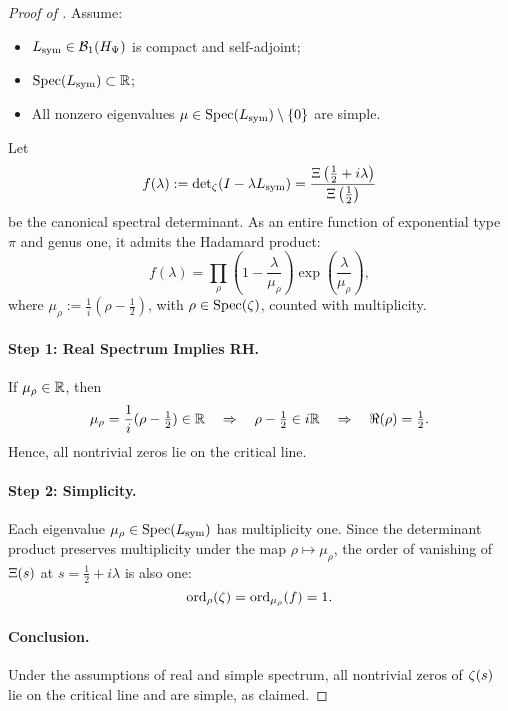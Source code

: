 \begin{proof}[Proof of ]
Assume:
\begin{itemize}
  \item \( L_{\mathrm{sym}} \in \mathcal{B}_1(H_{\Psi}) \) is compact and self-adjoint;
  \item \( \operatorname{Spec}(L_{\mathrm{sym}}) \subset \mathbb{R} \);
  \item All nonzero eigenvalues \( \mu \in \operatorname{Spec}(L_{\mathrm{sym}}) \setminus \{0\} \) are simple.
\end{itemize}

Let
\[
f(\lambda) := \det\nolimits_\zeta(I - \lambda L_{\mathrm{sym}}) = \frac{\Xi\left(\tfrac{1}{2} + i\lambda\right)}{\Xi\left(\tfrac{1}{2}\right)}
\]
be the canonical spectral determinant. As an entire function of exponential type \( \pi \) and genus one, it admits the Hadamard product:
\[
f(\lambda) = \prod_\rho \left(1 - \frac{\lambda}{\mu_\rho} \right) \exp\left( \frac{\lambda}{\mu_\rho} \right),
\]
where \( \mu_\rho := \frac{1}{i}(\rho - \tfrac{1}{2}) \), with \( \rho \in \operatorname{Spec}(\zeta) \), counted with multiplicity.

\paragraph{Step 1: Real Spectrum Implies RH.}
If \( \mu_\rho \in \mathbb{R} \), then
\[
\mu_\rho = \frac{1}{i}(\rho - \tfrac{1}{2}) \in \mathbb{R} \quad \Rightarrow \quad \rho - \tfrac{1}{2} \in i\mathbb{R} \quad \Rightarrow \quad \Re(\rho) = \tfrac{1}{2}.
\]
Hence, all nontrivial zeros lie on the critical line.

\paragraph{Step 2: Simplicity.}
Each eigenvalue \( \mu_\rho \in \operatorname{Spec}(L_{\mathrm{sym}}) \) has multiplicity one. Since the determinant product preserves multiplicity under the map \( \rho \mapsto \mu_\rho \), the order of vanishing of \( \Xi(s) \) at \( s = \tfrac{1}{2} + i\lambda \) is also one:
\[
\operatorname{ord}_\rho(\zeta) = \operatorname{ord}_{\mu_\rho}(f) = 1.
\]

\paragraph{Conclusion.}
Under the assumptions of real and simple spectrum, all nontrivial zeros of \( \zeta(s) \) lie on the critical line and are simple, as claimed.
\end{proof}
